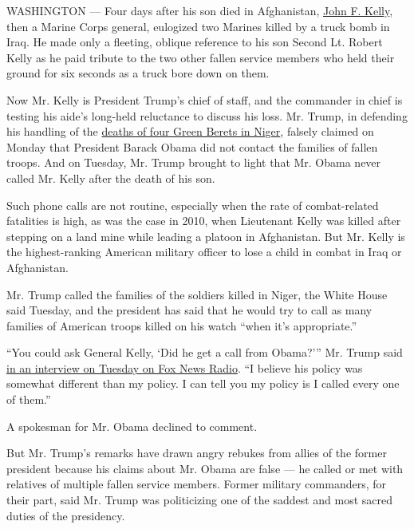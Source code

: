 WASHINGTON --- Four days after his son died in Afghanistan,
\href{https://www.nytimes3xbfgragh.onion/2017/07/28/us/politics/john-kelly-chief-of-staff-donald-trump.html?mcubz=3}{John
F. Kelly}, then a Marine Corps general, eulogized two Marines killed by
a truck bomb in Iraq. He made only a fleeting, oblique reference to his
son Second Lt. Robert Kelly as he paid tribute to the two other fallen
service members who held their ground for six seconds as a truck bore
down on them.

Now Mr. Kelly is President Trump's chief of staff, and the commander in
chief is testing his aide's long-held reluctance to discuss his loss.
Mr. Trump, in defending his handling of the
\href{https://www.nytimes3xbfgragh.onion/2017/10/06/world/africa/green-berets-niger-soldiers-killed.html}{deaths
of four Green Berets in Niger}, falsely claimed on Monday that President
Barack Obama did not contact the families of fallen troops. And on
Tuesday, Mr. Trump brought to light that Mr. Obama never called Mr.
Kelly after the death of his son.

Such phone calls are not routine, especially when the rate of
combat-related fatalities is high, as was the case in 2010, when
Lieutenant Kelly was killed after stepping on a land mine while leading
a platoon in Afghanistan. But Mr. Kelly is the highest-ranking American
military officer to lose a child in combat in Iraq or Afghanistan.

Mr. Trump called the families of the soldiers killed in Niger, the White
House said Tuesday, and the president has said that he would try to call
as many families of American troops killed on his watch ``when it's
appropriate.''

``You could ask General Kelly, `Did he get a call from Obama?''' Mr.
Trump said
\href{https://radio.foxnews.com/2017/10/17/president-donald-trump-on-tax-reform-were-the-highest-tax-nation-in-the-world-we-need-the-tax-cuts/}{in
an interview on Tuesday on Fox News Radio}. ``I believe his policy was
somewhat different than my policy. I can tell you my policy is I called
every one of them.''

A spokesman for Mr. Obama declined to comment.

But Mr. Trump's remarks have drawn angry rebukes from allies of the
former president because his claims about Mr. Obama are false --- he
called or met with relatives of multiple fallen service members. Former
military commanders, for their part, said Mr. Trump was politicizing one
of the saddest and most sacred duties of the presidency.

